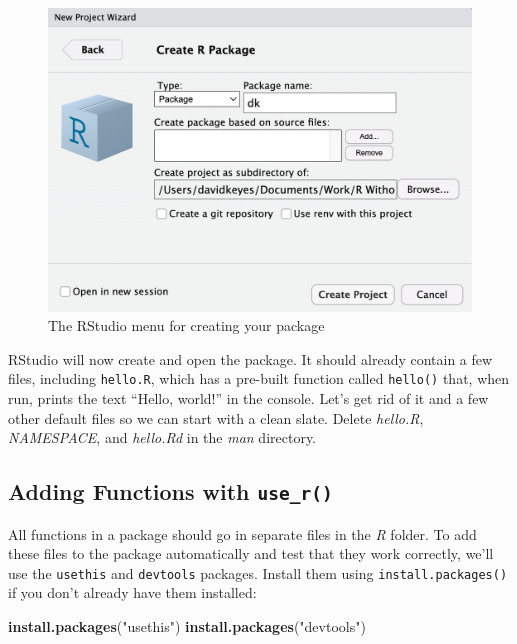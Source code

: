 \documentclass[
]{book}
\newenvironment{Shaded}{\begin{snugshade}}{\end{snugshade}}
\newcommand{\FunctionTok}[1]{\textcolor[rgb]{0.13,0.29,0.53}{\textbf{#1}}}
\newcommand{\NormalTok}[1]{#1}
\newcommand{\StringTok}[1]{\textcolor[rgb]{0.31,0.60,0.02}{#1}}
\begin{document}
\begin{figure}
\includegraphics[width=1\linewidth]{assets/create-r-package} \caption{The RStudio menu for creating your package}\label{fig:rstudio-create-package}
\end{figure}

RStudio will now create and open the package. It should already contain a few files, including \texttt{hello.R}, which has a pre-built function called \texttt{hello()} that, when run, prints the text ``Hello, world!'' in the console. Let's get rid of it and a few other default files so we can start with a clean slate. Delete \emph{hello.R}, \emph{NAMESPACE}, and \emph{hello.Rd} in the \emph{man} directory.

\hypertarget{adding-functions-with-use_r}{%
\subsection*{\texorpdfstring{Adding Functions with \texttt{use\_r()}}{Adding Functions with use\_r()}}\label{adding-functions-with-use_r}}

All functions in a package should go in separate files in the \emph{R} folder. To add these files to the package automatically and test that they work correctly, we'll use the \texttt{usethis} and \texttt{devtools} packages. Install them using \texttt{install.packages()} if you don't already have them installed:

\begin{Shaded}
\begin{Highlighting}[]
\FunctionTok{install.packages}\NormalTok{(}\StringTok{"usethis"}\NormalTok{)}
\FunctionTok{install.packages}\NormalTok{(}\StringTok{"devtools"}\NormalTok{)}
\end{Highlighting}
\end{Shaded}
\end{document}
